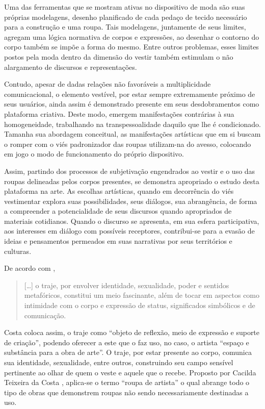 \begin{refsection}
    Uma das ferramentas que se mostram ativas no dispositivo de moda são suas próprias modelagens, desenho planificado de cada pedaço de tecido necessário para a construção e uma roupa. Tais modelagens, juntamente de seus limites, agregam uma lógica normativa de corpos e expressões, ao desenhar o contorno do corpo também se impõe a forma do mesmo. Entre outros problemas, esses limites postos pela moda dentro da dimensão do vestir também estimulam o não alargamento de discursos e representações. 

    Contudo, apesar de dadas relações não favoráveis a multiplicidade comunicacional, o elemento vestível, por estar sempre extremamente próximo de seus usuários, ainda assim é demonstrado presente em seus desdobramentos como plataforma criativa. Deste modo, emergem manifestações contrárias à sua homogeneidade, trabalhando na transpessoalidade daquilo que lhe é condicionado. Tamanha sua abordagem conceitual, as manifestações artísticas que em si buscam o romper com o viés padronizador das roupas utilizam-na do avesso, colocando em jogo o modo de funcionamento do próprio dispositivo. 

    Assim, partindo dos processos de subjetivação engendrados ao vestir e o uso das roupas delineadas pelos corpos presentes, se demonstra apropriado o estudo desta plataforma na arte. As escolhas artísticas, quando em decorrência do viés vestimentar explora suas possibilidades, seus diálogos, sua abrangência, de forma a compreender a potencialidade de seus discursos quando apropriados de materiais cotidianos. Quando o discurso se apresenta, em sua esfera participativa, aos interesses em diálogo com possíveis receptores, contribui-se para a evasão de ideias e pensamentos permeados em suas narrativas por seus territórios e culturas. 

    De acordo com \textcite[p.~75]{Costa2009Roupa},

    \begin{quotation}
        [\dots] o traje, por envolver identidade, sexualidade, poder e sentidos metafóricos, constitui um meio fascinante, além de tocar em aspectos como intimidade com o corpo e expressão de status, significados simbólicos e de comunicação.
    \end{quotation}

    Costa coloca assim, o traje como ``objeto de reflexão, meio de expressão e suporte de criação'', podendo oferecer a este que o faz uso, no caso, o artista ``espaço e substância para a obra de arte''. O traje, por estar presente ao corpo, comunica sua identidade, sexualidade, entre outros, construindo seu campo sensível pertinente ao olhar de quem o veste e aquele que o recebe. Proposto por Cacilda Teixeira da Costa \citeyear{Costa2009Roupa}, aplica-se o termo ``roupa de artista'' o qual abrange todo o tipo de obras que demonstrem roupas não sendo necessariamente destinadas a uso.


\end{refsection}

